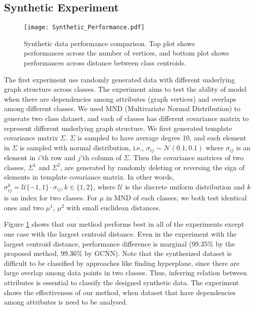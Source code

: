 \documentclass{article}
\begin{document}
\subsection{Synthetic Experiment}
\begin{figure}[!t]
\centering
\texttt{[image: Synthetic\_Performance.pdf]}
\caption{Synthetic data performance comparison. Top plot shows performances across the number of vertices, and bottom plot shows performances across distance between class centroids.}
\label{fig_synthetic}
\end{figure}

The first experiment use randomly generated data with different underlying graph structure across classes. The experiment aims to test the ability of model when there are dependencies among attributes (graph vertices) and overlaps among different classes. We used MND (Multivariate Normal Distribution) to generate two class dataset, and each of classes has different covariance matrix to represent different underlying graph structure. We first generated template covariance matrix $\Sigma$. $\Sigma$ is sampled to have average degree 10, and each element in $\Sigma$ is sampled with normal distribution, i.e., $\sigma_{ij} \sim \mathcal{N}(0.1, 0.1)$ where $\sigma_{ij}$ is an element in $i$'th row and $j$'th column of $\Sigma$. Then the covariance matrices of two classes, $\Sigma^1$ and $\Sigma^2$, are generated by randomly deleting or reversing the sign of elements in template covariance matrix. In other words, $\sigma_{ij}^k = \mathcal{U}\{-1,1\} \cdot \sigma_{ij}, k \in \{1,2\}$, where $\mathcal{U}$ is the discrete uniform distribution and $k$ is an index for two classes. For $\mu$ in MND of each classes, we both test identical ones and two $\mu^1$, $\mu^2$ with small euclidean distances.

Figure \ref{fig_synthetic} shows that our method performs best in all of the experiments except one case with the largest centroid distance. Even in the experiment with the largest centroid distance, performance difference is marginal (99.35\% by the proposed method, 99.36\% by GCNN). 
Note that the synthesized dataset is difficult to be classified by approaches like finding hyperplane, since there are large overlap among data points in two classes. Thus, inferring relation between attributes is essential to classify the designed synthetic data. The experiment shows the effectiveness of our method, when dataset that have dependencies among attributes is need to be analysed.
\end{document}
